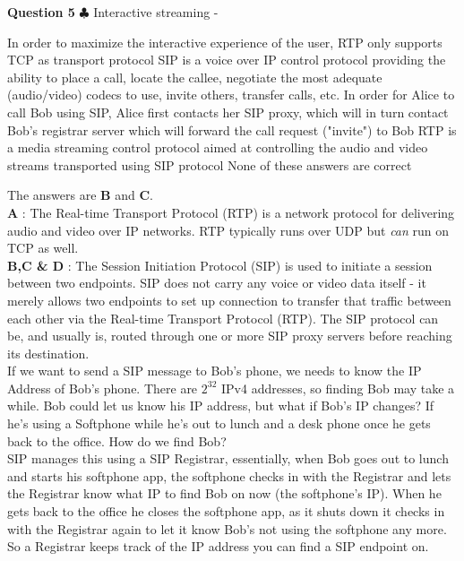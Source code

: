 \documentclass[en]{sourcefiles/eplexam}
\newcounter{choice}
\renewcommand\thechoice{\textbf{\Alph{choice}}}
\newcommand\choicelabel{\thechoice$\quad$}
\newenvironment{choices}%
  {\list{\choicelabel}%
     {\usecounter{choice}\def\makelabel##1{\hss\llap{##1}}%
       \settowidth{\leftmargin}{W.\hskip\labelsep\hskip 2.5em}%
       \def\choice{%
         \item
       } %
       \labelwidth\leftmargin\advance\labelwidth-\labelsep
       \topsep=0pt
       \partopsep=0pt
     }%
  }%
  {\endlist}
\begin{document}
\textbf{Question 5} $\clubsuit$ Interactive streaming 
\begin{choices}
     \choice In order to maximize the interactive experience of the user, RTP only supports TCP as transport protocol
     \choice SIP is a voice over IP control protocol providing the ability to place a call, locate the callee, negotiate the most adequate (audio/video) codecs to use, invite others, transfer calls, etc.
     \choice In order for Alice to call Bob using SIP, Alice first contacts her SIP proxy, which will in turn contact Bob's registrar server which will forward the call request ("invite") to Bob
     \choice RTP is a media streaming control protocol aimed at controlling the audio and video streams transported using SIP protocol
     \choice None of these answers are correct
\end{choices}
\begin{solution}
The answers are \textbf{B} and \textbf{C}.\\


\noindent \textbf{A} : The Real-time Transport Protocol (RTP) is a network protocol for delivering audio and video over IP networks. RTP typically runs over UDP but \textit{can} run on TCP as well.\\

\noindent \textbf{B,C \& D} :  The Session Initiation Protocol (SIP) is used to initiate a session between two endpoints. SIP does not carry any voice or video data itself - it merely allows two endpoints to set up connection to transfer that traffic between each other via the Real-time Transport Protocol (RTP).
The SIP protocol can be, and usually is, routed through one or more SIP proxy servers before reaching its destination.\\

\noindent If we want to send a SIP message to Bob’s phone, we needs to know the IP Address of Bob’s phone. There are $2^{32}$ IPv4 addresses, so finding Bob may take a while.
Bob could let us know his IP address, but what if Bob’s IP changes? If he’s using a Softphone while he’s out to lunch and a desk phone once he gets back to the office. How do we find Bob?\\

\noindent SIP manages this using a SIP Registrar, essentially, when Bob goes out to lunch and starts his softphone app, the softphone checks in with the Registrar and lets the Registrar know what IP to find Bob on now (the softphone’s IP).
When he gets back to the office he closes the softphone app, as it shuts down it checks in with the Registrar again to let it know Bob’s not using the softphone any more.\\

\noindent So a Registrar keeps track of the IP address you can find a SIP endpoint on.
\end{solution}
\end{document}
